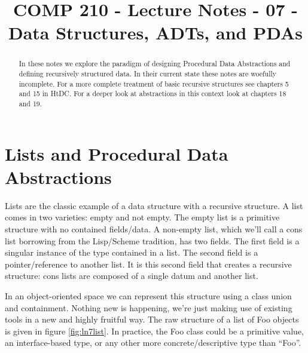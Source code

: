 \documentclass[]{tufte-handout}
\title{COMP 210 - Lecture Notes - 07 - Data Structures, ADTs, and PDAs}
\begin{document}
\maketitle

\begin{abstract}
In these notes we explore the paradigm of designing Procedural Data Abstractions and defining recursively structured data.  In their current state these notes are woefully incomplete. For a more complete treatment of basic recursive structures see chapters 5 and 15 in HtDC\cite{htdc}. For a deeper look at abstractions in this context look at chapters 18 and 19. 
\end{abstract}

\section{Lists and Procedural Data Abstractions}

Lists are the classic example of a data structure with a recursive structure. A list comes in two varieties: empty and not empty. The empty list is a primitive structure with no contained fields/data. A non-empty list, which we'll call a cons list borrowing from the Lisp/Scheme tradition, has two fields. The first field is a singular instance of the type contained in a list. The second field is a pointer/reference to another list.  It is this second field that creates a recursive structure: cons lists are composed of a single datum and another list. 

In an object-oriented space we can represent this structure using a class union and containment. Nothing new is happening, we're just making use of existing tools in a new and highly fruitful way. The raw structure of a list of Foo objects is given in figure \ref{fig:ln7list}. In practice, the Foo class could be a primitive value, an interface-based type, or any other more concrete/descriptive type than ``Foo''. 
\end{document}
